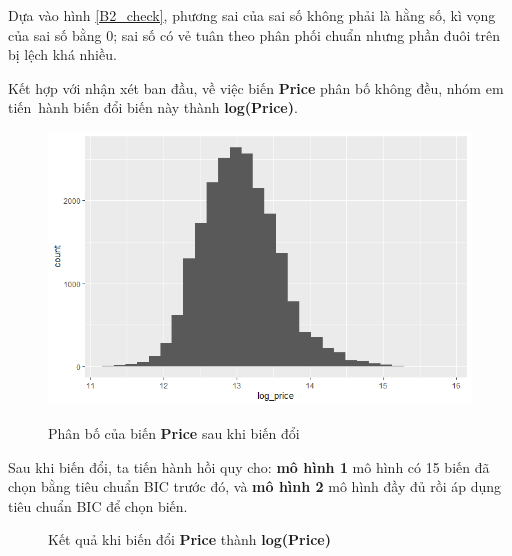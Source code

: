  Dựa vào hình \ref{B2_check}, phương sai của sai số không phải là hằng số, kì vọng của sai số bằng 0; sai số có vẻ tuân theo phân phối chuẩn nhưng phần đuôi trên bị lệch khá nhiều. 
 
 Kết hợp với nhận xét ban đầu, về việc biến \textbf{Price} phân bố không đều, nhóm em tiến~hành biến đổi biến này thành \textbf{log(Price)}.
 
 \begin{figure}[h!]
 	\centering
 	{\includegraphics[width=.6\linewidth]{../Photo Of Result/B2_logprice}}
 	\caption{Phân bố của biến \textbf{Price} sau khi biến đổi }
 	\label{B2_log}
 \end{figure}
 Sau khi biến đổi, ta tiến hành hồi quy cho: \textbf{mô hình 1} mô hình có 15 biến đã chọn bằng tiêu chuẩn BIC trước đó, và \textbf{mô hình 2} mô hình đầy đủ rồi áp dụng tiêu chuẩn BIC để chọn biến.
 
  \begin{figure}[h!]
 	\centering
 	\hfill
 	\caption{Kết quả khi biến đổi \textbf{Price} thành \textbf{log(Price)}}
 \end{figure}
 
